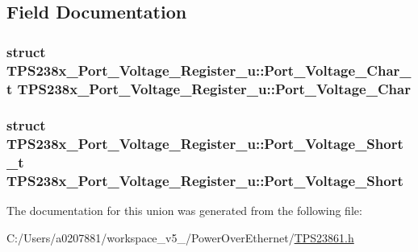 \subsection{Field Documentation}
\hypertarget{union_t_p_s238x___port___voltage___register__u_ae920d8ac08c3423d500ecf2e4f285b27}{
\subsubsection[{Port\-\_\-\-Voltage\-\_\-\-Char}]{\setlength{\rightskip}{0pt plus 5cm}struct {\bf T\-P\-S238x\-\_\-\-Port\-\_\-\-Voltage\-\_\-\-Register\-\_\-u\-::\-Port\-\_\-\-Voltage\-\_\-\-Char\-\_\-t}  T\-P\-S238x\-\_\-\-Port\-\_\-\-Voltage\-\_\-\-Register\-\_\-u\-::\-Port\-\_\-\-Voltage\-\_\-\-Char}}\label{union_t_p_s238x___port___voltage___register__u_ae920d8ac08c3423d500ecf2e4f285b27}
\hypertarget{union_t_p_s238x___port___voltage___register__u_a8c0eeae1c50b8c3360666a533d106f62}{
\subsubsection[{Port\-\_\-\-Voltage\-\_\-\-Short}]{\setlength{\rightskip}{0pt plus 5cm}struct {\bf T\-P\-S238x\-\_\-\-Port\-\_\-\-Voltage\-\_\-\-Register\-\_\-u\-::\-Port\-\_\-\-Voltage\-\_\-\-Short\-\_\-t}  T\-P\-S238x\-\_\-\-Port\-\_\-\-Voltage\-\_\-\-Register\-\_\-u\-::\-Port\-\_\-\-Voltage\-\_\-\-Short}}\label{union_t_p_s238x___port___voltage___register__u_a8c0eeae1c50b8c3360666a533d106f62}


The documentation for this union was generated from the following file\-:\begin{DoxyCompactItemize}
\item 
C\-:/\-Users/a0207881/workspace\-\_\-v5\-\_/\-Power\-Over\-Ethernet/\hyperlink{_t_p_s23861_8h}{T\-P\-S23861.\-h}\end{DoxyCompactItemize}
